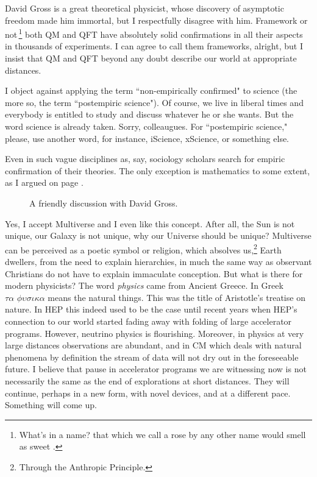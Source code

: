 \documentclass[epsfig,12pt]{article}
\begin{document}
David Gross is a great theoretical physicist, whose discovery of asymptotic freedom made him immortal, but I respectfully disagree with him. Framework or not\,\footnote{What's in a name? that which we call a rose
by any other name would smell as sweet \cite{DS}.} both QM and QFT have absolutely solid confirmations in all their aspects in thousands of experiments. I can agree to call them frameworks, alright, but I insist that  QM and QFT beyond any doubt describe our world at appropriate distances.  

I object against applying the term ``non-empirically confirmed" to science (the more so, the term ``postempiric science"). Of course, we live in liberal times and everybody is entitled to 
 study and discuss  whatever he or she wants. But the word science is already taken. Sorry, colleaugues.  For ``postempiric science," please, use another word, for instance,
iScience, xScience, or something else.

Even in such vague disciplines as, say, sociology
scholars search for empiric confirmation of their theories. The only exception is  mathematics to some extent, as I argued on page \pageref{p6}.

\begin{figure}[h]
\epsfxsize=11cm
\centerline{}
\caption{\small
A friendly discussion with David Gross.}
\label{figu4o}
\end{figure}

\label{p14}
Yes, I accept Multiverse and I even like this concept. After all, the Sun is not unique, our Galaxy is not unique, why our Universe should be unique? Multiverse  can be perceived as a poetic symbol or religion, which absolves us,\footnote{Through the Anthropic Principle.} Earth dwellers, from the need to explain hierarchies, in much the same way as observant Christians do not have to explain immaculate conception. But what is there for modern physicists? The word {\em physics} came from Ancient Greece.  In Greek $\tau \alpha \,\, \phi \upsilon \sigma \iota \kappa \alpha $ means the natural things. This was the title of Aristotle's treatise on nature.  In HEP this indeed used to be the case until recent years when  HEP's connection to our world started fading away with folding of large accelerator programs. However, neutrino physics is flourishing. Moreover, in physics at very large distances  observations are abundant, and in CM which deals with natural phenomena by definition the stream of data will not dry out in the foreseeable future. 
I believe that pause in accelerator programs we are witnessing now is not necessarily the same as the end of explorations at short distances. They will continue, perhaps in a new form, with novel devices,  and at a different pace.
Something will come up.
\vspace{2mm}
\end{document}
